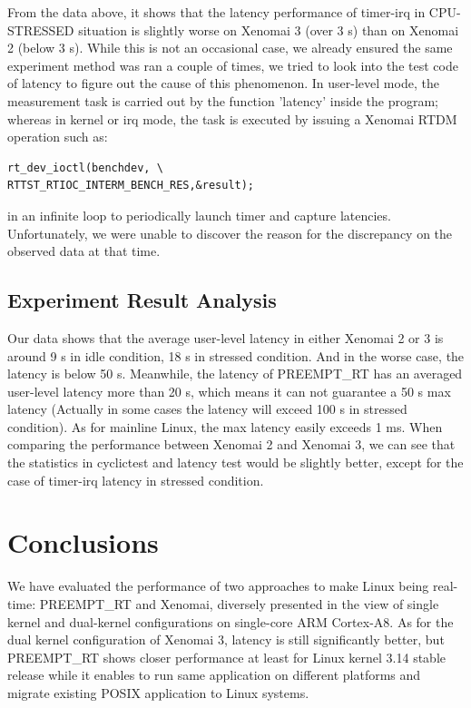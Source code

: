 \documentclass[10pt,a4paper]{article}
\begin{document}
\begin{multicols}{2}
From the data above, it shows that the latency performance of timer-irq in CPU-STRESSED situation is slightly worse on Xenomai 3 (over 3 \textmu s) than on Xenomai 2 (below 3 \textmu s). While this is not an occasional case, we already ensured the same experiment method was ran a couple of times, we tried to look into the test code of latency to figure out the cause of this phenomenon. In user-level mode, the measurement task is carried out by the function 'latency' inside the program; whereas in kernel or irq mode, the task is executed by issuing a Xenomai RTDM operation such as:
\begin{verbatim}
rt_dev_ioctl(benchdev, \
RTTST_RTIOC_INTERM_BENCH_RES,&result); 
\end{verbatim} 
in an infinite loop to periodically launch timer and capture latencies. Unfortunately, we were unable to discover the reason for the discrepancy on the observed data at that time.

\subsection{Experiment Result Analysis}
Our data shows that the average user-level latency in either Xenomai 2 or 3 is around 9 \textmu s in idle condition, 18 \textmu s in stressed condition. And in the worse case, the latency is below 50 \textmu s. Meanwhile, the latency of PREEMPT\_RT has an averaged user-level latency more than 20 \textmu s, which means it can not guarantee a 50 \textmu s max latency (Actually in some cases the latency will exceed 100 \textmu s in stressed condition).  As for mainline Linux, the max latency easily exceeds 1 ms. When comparing the performance between Xenomai 2 and Xenomai 3, we can see that the statistics in cyclictest and latency test would be slightly better, except for the case of timer-irq latency in stressed condition.

\section{Conclusions}
We have evaluated the performance of two approaches to make Linux being real-time: PREEMPT\_RT and Xenomai, diversely presented in the view of single kernel and dual-kernel configurations on single-core ARM Cortex-A8. As for the dual kernel configuration of Xenomai 3, latency is still significantly better, but PREEMPT\_RT shows closer performance at least for Linux kernel 3.14 stable release while it enables to run same application on different platforms and migrate existing POSIX application to Linux systems.


\end{multicols}
\end{document}
